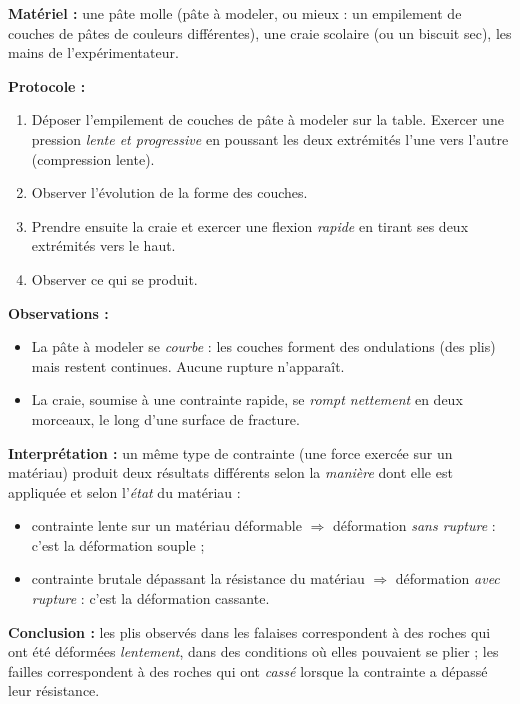 \documentclass[11pt]{article}
\newcommand{\cle}[1]{{\popxbold\color{popdark}#1}}
\begin{document}
\begin{experience}
\textbf{Matériel :} une pâte molle (pâte à modeler, ou mieux : un empilement de couches de pâtes de couleurs différentes), une craie scolaire (ou un biscuit sec), les mains de l'expérimentateur.

\textbf{Protocole :}
\begin{enumerate}
\item Déposer l'empilement de couches de pâte à modeler sur la table. Exercer une pression \emph{lente et progressive} en poussant les deux extrémités l'une vers l'autre (compression lente).
\item Observer l'évolution de la forme des couches.
\item Prendre ensuite la craie et exercer une flexion \emph{rapide} en tirant ses deux extrémités vers le haut.
\item Observer ce qui se produit.
\end{enumerate}

\textbf{Observations :}
\begin{itemize}
\item La pâte à modeler se \emph{courbe} : les couches forment des ondulations (des plis) mais restent continues. Aucune rupture n'apparaît.
\item La craie, soumise à une contrainte rapide, se \emph{rompt nettement} en deux morceaux, le long d'une surface de fracture.
\end{itemize}

\textbf{Interprétation :} un même type de contrainte (une force exercée sur un matériau) produit deux résultats différents selon la \emph{manière} dont elle est appliquée et selon l'\emph{état} du matériau :
\begin{itemize}
\item contrainte lente sur un matériau déformable $\Rightarrow$ déformation \emph{sans rupture} : c'est la \cle{déformation souple} ;
\item contrainte brutale dépassant la résistance du matériau $\Rightarrow$ déformation \emph{avec rupture} : c'est la \cle{déformation cassante}.
\end{itemize}

\textbf{Conclusion :} les plis observés dans les falaises correspondent à des roches qui ont été déformées \emph{lentement}, dans des conditions où elles pouvaient se plier ; les failles correspondent à des roches qui ont \emph{cassé} lorsque la contrainte a dépassé leur résistance.
\end{experience}
\end{document}
